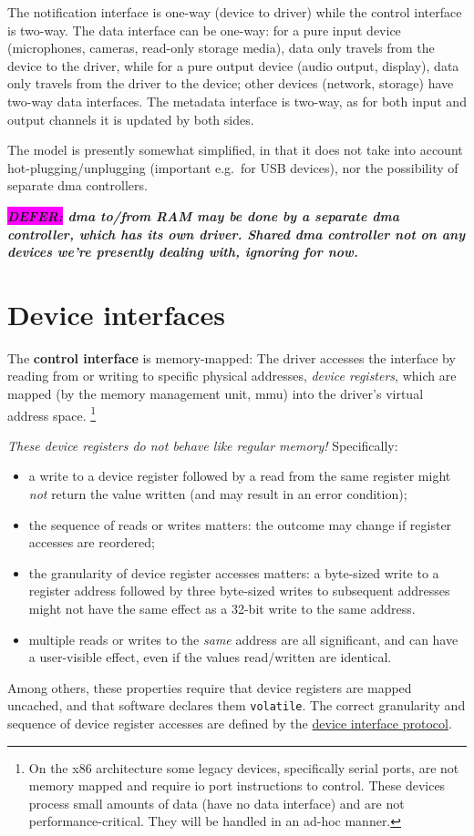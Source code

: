 \documentclass[a4paper,12pt]{report}
\newcommand{\DEFER}[1]{\textbf{\textsl{\colorbox{magenta}{DEFER:} #1}}}
\newcommand{\DEFER}[1]{\relax}
\newcommand{\code}[1]{\texttt{#1}}
\begin{document}
The notification interface is one-way (device to driver) while the
control interface is two-way. The data interface can be one-way: for a
pure  input device (microphones, cameras, read-only storage media), data only travels from
the device to the driver, while for a pure output device
(audio output, display), data only
travels from the driver to the device; other devices (network,
storage) have two-way data interfaces. The metadata interface is
two-way, as for both input and output channels it is updated by both
sides.

The model is presently somewhat simplified, in that it does not take
into account hot-plugging/unplugging (important e.g.\ for USB devices),
nor the possibility of separate \gls{dma} controllers.

\DEFER{\gls{dma} to/from RAM may be done by a separate \gls{dma} controller,
  which has its own driver. Shared \gls{dma} controller not on any devices
  we're presently dealing with, ignoring for now.}

\section{Device interfaces}

The \textbf{control interface} is memory-mapped: The driver accesses the
interface by reading from or writing to specific physical addresses,
\emph{device registers}, which are mapped (by the memory management
unit, \gls{mmu}) into the driver's virtual address space.%
\footnote{On the x86 architecture some legacy devices, specifically
  serial ports, are not memory mapped and require \gls{io} port instructions to
  control.  These devices process small amounts of data (have no data
  interface) and are not performance-critical. They will be handled in
  an ad-hoc manner.}

\emph{These device
registers do \emph{not} behave like regular memory!} Specifically:
\begin{itemize}
\item a write to a device register followed by a read from the same
  register might \emph{not} return the value written (and may result
  in an error condition);
\item the sequence of reads or writes matters: the outcome may change
  if register accesses are reordered;
\item the granularity of device register accesses matters: a byte-sized write to a register address
  followed by three byte-sized writes to subsequent addresses might not
  have the same effect as a 32-bit write to the same address.
\item multiple reads or writes to the \emph{same} address are all
  significant, and can have a user-visible effect, even if the values
  read/written are identical.
\end{itemize}
Among others, these properties require that device registers are
mapped uncached, and that software declares them \code{volatile}. The
correct granularity and sequence of device register accesses are
defined by the \hyperref[s:dev_proto]{device interface protocol}.
\end{document}
